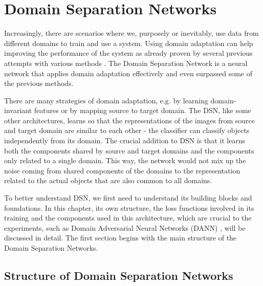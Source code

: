 \chapter{Domain Separation Networks} \label{ch:dsn}
Increasingly, there are scenarios where we, purposely or inevitably, use data from different domains to train and use a system. Using domain adaptation can help improving the performance of the system as already proven by several previous attempts with various methods \cite{DAGanin, DASurvey}. The Domain Separation Network \cite{DSN} is a neural network that applies domain adaptation effectively and even surpassed some of the previous methods. 

There are many strategies of domain adaptation, e.g. by learning domain-invariant features or by mapping source to target domain. The DSN, like some other architectures, learns so that the representations of the images from source and target domain are similar to each other - the classifier can classify objects independently from its domain. The crucial addition to DSN is that it learns both the components shared by source and target domains and the components only related to a single domain. This way, the network would not mix up the noise coming from shared components of the domains to the representation related to the actual objects that are also common to all domains. 

To better understand DSN, we first need to understand its building blocks and foundations. In this chapter, its own structure, the loss functions involved in its training and the components used in this architecture, which are crucial to the experiments, such as Domain Adversarial Neural Networks (DANN) \cite{dannGanin}, will be discussed in detail. The first section begins with the main structure of the Domain Separation Networks.
 
\section{Structure of Domain Separation Networks} \label{sec:dsnStruct}

